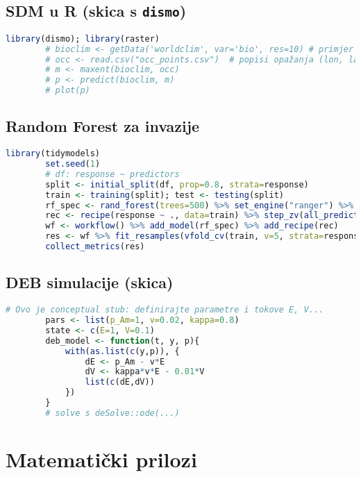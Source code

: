 \documentclass[11pt,oneside]{book}
\newcommand{\R}{\textsf{R}}
\begin{document}
	\section{SDM u \R{} (skica s \texttt{dismo})}
	\begin{lstlisting}[language=R,caption={SDM skica s bioklimatskim varijablama}]
		library(dismo); library(raster)
		# bioclim <- getData('worldclim', var='bio', res=10) # primjer dohvaćanja
		# occ <- read.csv("occ_points.csv")  # popisi opažanja (lon, lat)
		# m <- maxent(bioclim, occ)
		# p <- predict(bioclim, m)
		# plot(p)
	\end{lstlisting}
	
	\section{Random Forest za invazije}
	\begin{lstlisting}[language=R,caption={RF klasifikator s unakrsnom provjerom}]
		library(tidymodels)
		set.seed(1)
		# df: response ~ predictors
		split <- initial_split(df, prop=0.8, strata=response)
		train <- training(split); test <- testing(split)
		rf_spec <- rand_forest(trees=500) %>% set_engine("ranger") %>% set_mode("classification")
		rec <- recipe(response ~ ., data=train) %>% step_zv(all_predictors())
		wf <- workflow() %>% add_model(rf_spec) %>% add_recipe(rec)
		res <- wf %>% fit_resamples(vfold_cv(train, v=5, strata=response), metrics=metric_set(roc_auc,accuracy))
		collect_metrics(res)
	\end{lstlisting}
	
	\section{DEB simulacije (skica)}
	\begin{lstlisting}[language=R,caption={Minimalna DEB skica (konceptualno)}]
		# Ovo je conceptual stub: definirajte parametre i tokove E, V...
		pars <- list(p_Am=1, v=0.02, kappa=0.8)
		state <- c(E=1, V=0.1)
		deb_model <- function(t, y, p){
			with(as.list(c(y,p)), {
				dE <- p_Am - v*E
				dV <- kappa*v*E - 0.01*V
				list(c(dE,dV))
			})
		}
		# solve s deSolve::ode(...)
	\end{lstlisting}
	
	\appendix
	
	\chapter{Matematički prilozi}
\end{document}

